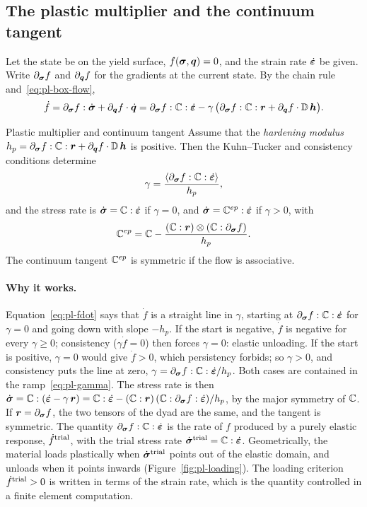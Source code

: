 \subsection{The plastic multiplier and the continuum tangent}\label{ssec:pl-tangent}
%
Let the state be on the yield surface, $f(\bm{\sigma},\bm{q})=0$, and the strain rate
$\dot{\bm{\varepsilon}}$ be given. Write $\partial_{\bm{\sigma}}f$ and $\partial_{\bm{q}}f$ for the
gradients at the current state. By the chain rule and~\eqref{eq:pl-box-flow},
\begin{equation}\label{eq:pl-fdot}
  \dot f=\partial_{\bm{\sigma}}f:\dot{\bm{\sigma}}+\partial_{\bm{q}}f\cdot\dot{\bm{q}}
  =\partial_{\bm{\sigma}}f:\mathbb{C}:\dot{\bm{\varepsilon}}
  -\gamma\,\bigl(\partial_{\bm{\sigma}}f:\mathbb{C}:\bm{r}+\partial_{\bm{q}}f\cdot\mathbb{D}\,\bm{h}\bigr).
\end{equation}
\begin{gbox}{Plastic multiplier and continuum tangent}\label{prop:pl-cep}
Assume that the \emph{hardening modulus}
$h_p=\partial_{\bm{\sigma}}f:\mathbb{C}:\bm{r}+\partial_{\bm{q}}f\cdot\mathbb{D}\,\bm{h}$ is
positive. Then the Kuhn--Tucker and consistency conditions determine
\begin{equation}\label{eq:pl-gamma}
  \gamma=\frac{\langle \partial_{\bm{\sigma}}f:\mathbb{C}:\dot{\bm{\varepsilon}}\rangle}{h_p},
\end{equation}
and the stress rate is $\dot{\bm{\sigma}}=\mathbb{C}:\dot{\bm{\varepsilon}}$ if $\gamma=0$, and
$\dot{\bm{\sigma}}=\mathbb{C}^{ep}:\dot{\bm{\varepsilon}}$ if $\gamma>0$, with
\begin{equation}\label{eq:pl-cep}
  \mathbb{C}^{ep}=\mathbb{C}-\frac{(\mathbb{C}:\bm{r})\otimes(\mathbb{C}:\partial_{\bm{\sigma}}f)}{h_p}.
\end{equation}
The continuum tangent $\mathbb{C}^{ep}$ is symmetric if the flow is associative.
\end{gbox}
\paragraph{Why it works.} Equation~\eqref{eq:pl-fdot} says that $\dot f$ is a
straight line in $\gamma$, starting at $\partial_{\bm{\sigma}}f:\mathbb{C}:\dot{\bm{\varepsilon}}$ for
$\gamma=0$ and going down with slope $-h_p$. If the start is negative, $\dot f$
is negative for every $\gamma\ge0$; consistency ($\gamma\dot f=0$) then forces
$\gamma=0$: elastic unloading. If the start is positive, $\gamma=0$ would give
$\dot f>0$, which persistency forbids; so $\gamma>0$, and consistency puts the
line at zero, $\gamma=\partial_{\bm{\sigma}}f:\mathbb{C}:\dot{\bm{\varepsilon}}/h_p$. Both cases are
contained in the ramp~\eqref{eq:pl-gamma}. The stress rate is then
$\dot{\bm{\sigma}}=\mathbb{C}:(\dot{\bm{\varepsilon}}-\gamma\,\bm{r})=\mathbb{C}:\dot{\bm{\varepsilon}}-(\mathbb{C}:\bm{r})\,
(\mathbb{C}:\partial_{\bm{\sigma}}f:\dot{\bm{\varepsilon}})/h_p$, by the major symmetry of $\mathbb{C}$. If
$\bm{r}=\partial_{\bm{\sigma}}f$, the two tensors of the dyad are the same, and the
tangent is symmetric.
The quantity $\partial_{\bm{\sigma}}f:\mathbb{C}:\dot{\bm{\varepsilon}}$ is the rate of $f$ produced by a
purely elastic response, $\dot f^{\mathrm{trial}}$, with the trial stress rate
$\dot{\bm{\sigma}}^{\mathrm{trial}}=\mathbb{C}:\dot{\bm{\varepsilon}}$. Geometrically, the material loads plastically
when $\dot{\bm{\sigma}}^{\mathrm{trial}}$ points out of the elastic domain, and unloads when it
points inwards (Figure~\ref{fig:pl-loading}). The loading criterion
$\dot f^{\mathrm{trial}}>0$ is written in terms of the strain rate, which is the
quantity controlled in a finite element computation.

